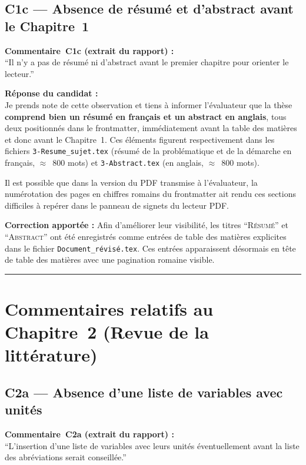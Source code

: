 \documentclass[12pt,a4paper]{article}
\newcommand{\Commentaire}[2]{%
  \begin{reviewerbox}
    \textbf{Commentaire~#1 (extrait du rapport) :}\\#2
  \end{reviewerbox}%
}
\newcommand{\Reponse}[1]{%
  \begin{responsebox}
    \textbf{Réponse du candidat :}\\#1
  \end{responsebox}%
}
\begin{document}
\subsection*{C1c --- Absence de résumé et d'abstract avant le Chapitre~1}

\Commentaire{C1c}{
  ``Il n'y a pas de résumé ni d'abstract avant le premier chapitre pour orienter le lecteur.''
}

\Reponse{
Je prends note de cette observation et tiens à informer l'évaluateur que la thèse \textbf{comprend bien un résumé en français et un abstract en anglais}, tous deux positionnés dans le frontmatter, immédiatement avant la table des matières et donc avant le Chapitre~1. Ces éléments figurent respectivement dans les fichiers \texttt{3-Resume\_sujet.tex} (résumé de la problématique et de la démarche en français, $\approx$~800 mots) et \texttt{3-Abstract.tex} (en anglais, $\approx$~800 mots).

Il est possible que dans la version du PDF transmise à l'évaluateur, la numérotation des pages en chiffres romains du frontmatter ait rendu ces sections difficiles à repérer dans le panneau de signets du lecteur PDF.

\textbf{Correction apportée :} Afin d'améliorer leur visibilité, les titres ``\textsc{Résumé}'' et ``\textsc{Abstract}'' ont été enregistrés comme entrées de table des matières explicites dans le fichier \texttt{Document\_révisé.tex}. Ces entrées apparaissent désormais en tête de table des matières avec une pagination romaine visible.
}

\bigskip
\hrule
\bigskip

\section*{Commentaires relatifs au Chapitre~2 (Revue de la littérature)}

\subsection*{C2a --- Absence d'une liste de variables avec unités}

\Commentaire{C2a}{
  ``L'insertion d'une liste de variables avec leurs unités éventuellement avant la liste des
  abréviations serait conseillée.''
}
\end{document}
